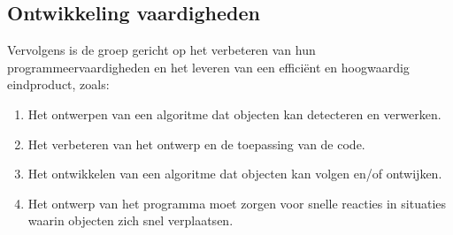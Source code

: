 \subsection{Ontwikkeling vaardigheden}
Vervolgens is de groep gericht op het verbeteren van hun programmeervaardigheden en het leveren van een efficiënt en hoogwaardig eindproduct, zoals:
\begin{enumerate}
    \item Het ontwerpen van een algoritme dat objecten kan detecteren en verwerken.
    \item Het verbeteren van het ontwerp en de toepassing van de code.
    \item Het ontwikkelen van een algoritme dat objecten kan volgen en/of ontwijken.
    \item Het ontwerp van het programma moet zorgen voor snelle reacties in situaties waarin objecten zich snel verplaatsen.
\end{enumerate}
